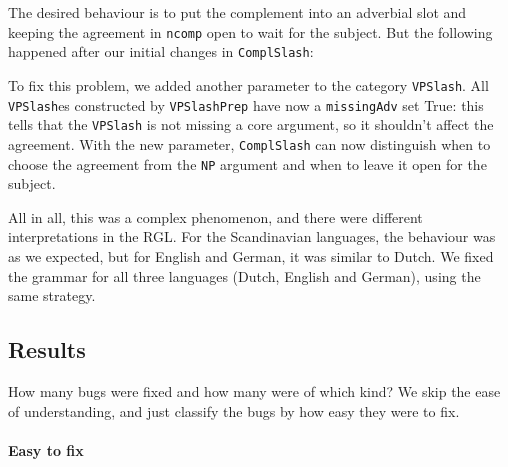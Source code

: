 The desired behaviour is to put the complement into an adverbial slot
and keeping the agreement in \texttt{ncomp} open to wait for the
subject. But the following happened after our initial changes in
\texttt{ComplSlash}:

\begin{EmptyItem}
\begin{Highlighting}[]
    \FunctionTok{=}  \NormalTok{;}
\FunctionTok{=} \OtherTok{=>}  \NormalTok{\} ; }
\end{Highlighting}
\end{EmptyItem}

To fix this problem, we added another parameter to the category
\texttt{VPSlash}. All \texttt{VPSlash}es constructed by
\texttt{VPSlashPrep} have now a \texttt{missingAdv} set True: this tells
that the \texttt{VPSlash} is not missing a core argument, so it
shouldn't affect the agreement. With the new parameter,
\texttt{ComplSlash} can now distinguish when to choose the agreement
from the \texttt{NP} argument and when to leave it open for the subject.

All in all, this was a complex phenomenon, and there were different
interpretations in the RGL. For the Scandinavian languages, the
behaviour was as we expected, but for English and German, it was
similar to Dutch. We fixed the grammar for all three languages (Dutch,
English and German), using the same strategy.

\subsection{Results}\label{numbers}

How many bugs were fixed and how many were of which kind? We skip the
ease of understanding, and just classify the bugs by how easy they were to fix.

\paragraph{Easy to fix}

